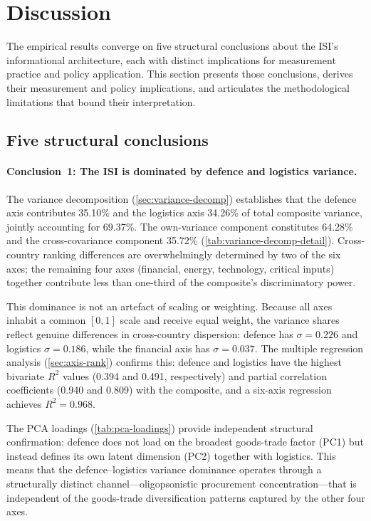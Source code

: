 \section{Discussion}\label{sec:discussion}

The empirical results converge on five structural conclusions about
the ISI's informational architecture, each with distinct implications
for measurement practice and policy application.  This section
presents those conclusions, derives their measurement and policy
implications, and articulates the methodological limitations that
bound their interpretation.

\subsection{Five structural conclusions}

\paragraph{Conclusion~1: The ISI is dominated by defence and logistics
variance.}
The variance decomposition (\cref{sec:variance-decomp}) establishes that
the defence axis contributes 35.10\% and the logistics axis 34.26\%
of total composite variance, jointly accounting for 69.37\%.  The
own-variance component constitutes 64.28\% and the cross-covariance
component 35.72\% (\cref{tab:variance-decomp-detail}).  Cross-country
ranking differences are overwhelmingly determined by two of the six
axes; the remaining four axes (financial, energy, technology, critical
inputs) together contribute less than one-third of the composite's
discriminatory power.

This dominance is not an artefact of scaling or weighting.  Because
all axes inhabit a common $[0,1]$ scale and receive equal weight,
the variance shares reflect genuine differences in cross-country
dispersion: defence has $\sigma = 0.226$ and logistics $\sigma = 0.186$,
while the financial axis has $\sigma = 0.037$.  The multiple
regression analysis (\cref{sec:axis-rank}) confirms this: defence and
logistics have the highest bivariate $R^2$ values (0.394 and 0.491,
respectively) and partial correlation coefficients (0.940 and 0.809)
with the composite, and a six-axis regression achieves $R^2 = 0.968$.

The PCA loadings (\cref{tab:pca-loadings}) provide independent
structural confirmation: defence does not load on the broadest
goods-trade factor (PC1) but instead defines its own latent
dimension (PC2) together with logistics.  This means that the
defence--logistics variance dominance operates through a
structurally distinct channel---oligopsonistic procurement
concentration---that is independent of the goods-trade
diversification patterns captured by the other four axes.

